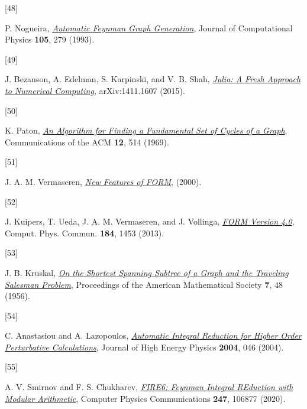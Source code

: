 \documentclass[
  10pt,
  a4paper,
  DIV=11,
  numbers=noendperiod,
  twoside]{scrreprt}
\newlength{\cslhangindent}
\newlength{\csllabelwidth}
\newlength{\cslentryspacingunit} %
\newenvironment{CSLReferences}[2] %
 {%
  \setlength{\parindent}{0pt}
  \ifodd #1
  \let\oldpar\par
  \def\par{\hangindent=\cslhangindent\oldpar}
  \fi
  \setlength{\parskip}{#2\cslentryspacingunit}
 }%
 {}
\newcommand{\CSLLeftMargin}[1]{\parbox[t]{\csllabelwidth}{#1}}
\newcommand{\CSLRightInline}[1]{\parbox[t]{\linewidth - \csllabelwidth}{#1}\break}
\DeclareRobustCommand{\[}{\begin{equation}}
\DeclareRobustCommand{\]}{\end{equation}}
\begin{document}
\begin{CSLReferences}{0}{0}
\leavevmode{}%
\CSLLeftMargin{{[}48{]} }%
\CSLRightInline{P. Nogueira,
\emph{\href{https://doi.org/10.1006/jcph.1993.1074}{Automatic {Feynman
Graph Generation}}}, Journal of Computational Physics \textbf{105}, 279
(1993).}

\leavevmode{}%
\CSLLeftMargin{{[}49{]} }%
\CSLRightInline{J. Bezanson, A. Edelman, S. Karpinski, and V. B. Shah,
\emph{\href{https://arxiv.org/abs/1411.1607}{Julia: {A Fresh Approach}
to {Numerical Computing}}}, arXiv:1411.1607 (2015).}

\leavevmode{}%
\CSLLeftMargin{{[}50{]} }%
\CSLRightInline{K. Paton,
\emph{\href{https://doi.org/10.1145/363219.363232}{An Algorithm for
Finding a Fundamental Set of Cycles of a Graph}}, Communications of the
ACM \textbf{12}, 514 (1969).}

\leavevmode{}%
\CSLLeftMargin{{[}51{]} }%
\CSLRightInline{J. A. M. Vermaseren,
\emph{\href{https://arxiv.org/abs/math-ph/0010025}{New Features of
{FORM}}}, (2000).}

\leavevmode{}%
\CSLLeftMargin{{[}52{]} }%
\CSLRightInline{J. Kuipers, T. Ueda, J. A. M. Vermaseren, and J.
Vollinga, \emph{\href{https://doi.org/10.1016/j.cpc.2012.12.028}{{FORM}
Version 4.0}}, Comput. Phys. Commun. \textbf{184}, 1453 (2013).}

\leavevmode{}%
\CSLLeftMargin{{[}53{]} }%
\CSLRightInline{J. B. Kruskal,
\emph{\href{https://doi.org/10.1090/S0002-9939-1956-0078686-7}{On the
Shortest Spanning Subtree of a Graph and the Traveling Salesman
Problem}}, Proceedings of the American Mathematical Society \textbf{7},
48 (1956).}

\leavevmode{}%
\CSLLeftMargin{{[}54{]} }%
\CSLRightInline{C. Anastasiou and A. Lazopoulos,
\emph{\href{https://doi.org/10.1088/1126-6708/2004/07/046}{Automatic
{Integral Reduction} for {Higher Order Perturbative Calculations}}},
Journal of High Energy Physics \textbf{2004}, 046 (2004).}

\leavevmode{}%
\CSLLeftMargin{{[}55{]} }%
\CSLRightInline{A. V. Smirnov and F. S. Chukharev,
\emph{\href{https://doi.org/10.1016/j.cpc.2019.106877}{{FIRE6}: {Feynman
Integral REduction} with {Modular Arithmetic}}}, Computer Physics
Communications \textbf{247}, 106877 (2020).}


\end{CSLReferences}
\end{document}
